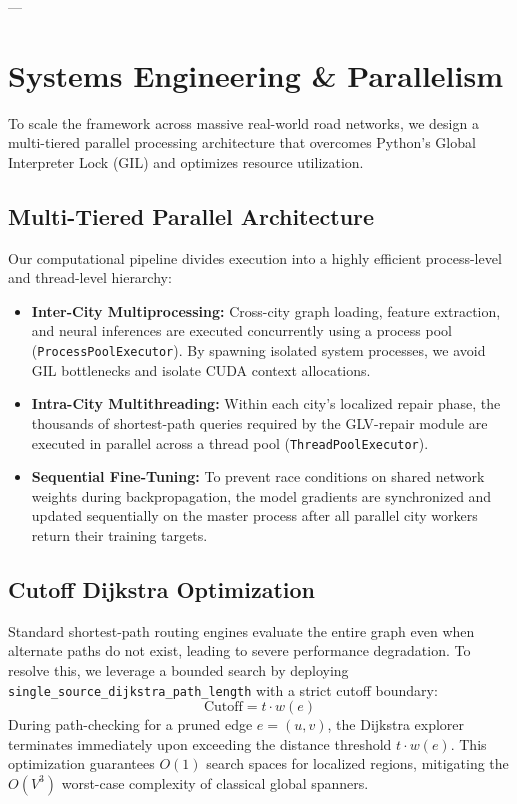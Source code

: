 \documentclass[journal]{IEEEtran}
\begin{document}
---

\section{Systems Engineering \& Parallelism}

To scale the framework across massive real-world road networks, we design a multi-tiered parallel processing architecture that overcomes Python's Global Interpreter Lock (GIL) and optimizes resource utilization.

\subsection{Multi-Tiered Parallel Architecture}
Our computational pipeline divides execution into a highly efficient process-level and thread-level hierarchy:
\begin{itemize}
    \item \textbf{Inter-City Multiprocessing:} Cross-city graph loading, feature extraction, and neural inferences are executed concurrently using a process pool (\texttt{ProcessPoolExecutor}). By spawning isolated system processes, we avoid GIL bottlenecks and isolate CUDA context allocations.
    \item \textbf{Intra-City Multithreading:} Within each city's localized repair phase, the thousands of shortest-path queries required by the GLV-repair module are executed in parallel across a thread pool (\texttt{ThreadPoolExecutor}). 
    \item \textbf{Sequential Fine-Tuning:} To prevent race conditions on shared network weights during backpropagation, the model gradients are synchronized and updated sequentially on the master process after all parallel city workers return their training targets.
\end{itemize}

\subsection{Cutoff Dijkstra Optimization}
Standard shortest-path routing engines evaluate the entire graph even when alternate paths do not exist, leading to severe performance degradation. To resolve this, we leverage a bounded search by deploying \texttt{single\_source\_dijkstra\_path\_length} with a strict cutoff boundary:
\begin{equation}
    \text{Cutoff} = t \cdot w(e)
\end{equation}
During path-checking for a pruned edge $e=(u, v)$, the Dijkstra explorer terminates immediately upon exceeding the distance threshold $t \cdot w(e)$. This optimization guarantees $O(1)$ search spaces for localized regions, mitigating the $O(V^3)$ worst-case complexity of classical global spanners.
\end{document}
